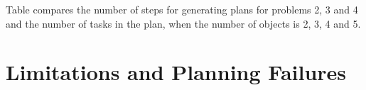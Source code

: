 \documentclass[paper=a4, fontsize=11pt]{scrartcl}
\begin{document}
	
	Table compares the number of steps for generating plans for problems 2, 3 and 4 and the number of tasks in the plan, when the number of objects is 2, 3, 4 and 5.
	

	\section{Limitations and Planning Failures} \label{sec:limitations}


	
	{}
	
	
	
\end{document}
